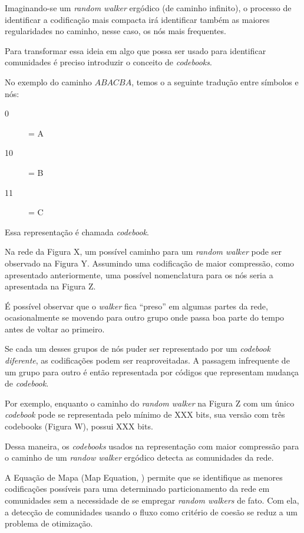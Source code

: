 \documentclass[
  article,
  11pt,
  a4paper,
  english,
  brazil,
  sumario=tradicional]{abntex2}
\begin{document}
Imaginando-se um \textit{random walker} ergódico (de caminho infinito), o processo de identificar a codificação mais compacta irá identificar também as maiores regularidades no caminho, nesse caso, os nós mais frequentes.

Para transformar essa ideia em algo que possa ser usado para identificar comunidades é preciso introduzir o conceito de \textit{codebooks}.

No exemplo do caminho $ABACBA$, temos o a seguinte tradução entre símbolos e nós:

\begin{description}
  \item[0] = A
  \item[10] = B
  \item[11] = C
\end{description}

Essa representação é chamada \textit{codebook}.

Na rede da Figura X, um possível caminho para um \textit{random walker} pode ser observado na Figura Y. Assumindo uma codificação de maior compressão, como apresentado anteriormente, uma possível nomenclatura para os nós seria a apresentada na Figura Z.

É possível observar que o \textit{walker} fica \enquote{preso} em algumas partes da rede, ocasionalmente se movendo para outro grupo onde passa boa parte do tempo antes de voltar ao primeiro.

Se cada um desses grupos de nós puder ser representado por um \textit{codebook diferente}, as codificações podem ser reaproveitadas. A passagem infrequente de um grupo para outro é então representada por códigos que representam mudança de \textit{codebook}.

Por exemplo, enquanto o caminho do \textit{random walker} na Figura Z com um único \textit{codebook} pode se representada pelo mínimo de XXX bits, sua versão com três codebooks (Figura W), possui XXX bits.

Dessa maneira, os \textit{codebooks} usados na representação com maior compressão para o caminho de um \textit{randow walker} ergódico detecta as comunidades da rede.

A Equação de Mapa (Map Equation, \cite{Rosvall2009-sd}) permite que se identifique as menores codificações possíveis para uma determinado particionamento da rede em comunidades sem a necessidade de se empregar \textit{random walkers} de fato. Com ela, a detecção de comunidades usando o fluxo como critério de coesão se reduz a um problema de otimização.
\end{document}

